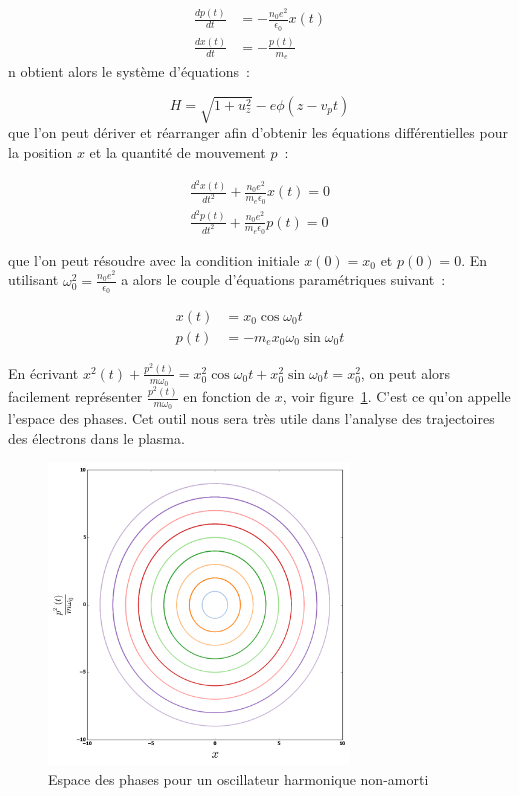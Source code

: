 \documentclass[a4paper]{book}
\begin{document}
\begin{eqnarray}
        \frac{dp(t)}{dt}&=-\frac{n_0e^2}{\epsilon_0}x(t)\\
        \frac{dx(t)}{dt}&=-\frac{p(t)}{m_e}
\end{eqnarray}
n obtient alors le système d'équations~:

\begin{equation}
    H=\sqrt{1+u_z^2}-e\phi(z-v_pt)
\end{equation}
que l'on peut dériver et réarranger afin d'obtenir les équations différentielles pour la position $x$ et la quantité de mouvement $p$~:

\begin{eqnarray}
        \frac{d^2x(t)}{dt^2} +\frac{n_0e^2}{m_e\epsilon_0}x(t)= 0\\
        \frac{d^2p(t)}{dt^2} +\frac{n_0e^2}{m_e\epsilon_0}p(t)= 0
\end{eqnarray}

que l'on peut résoudre avec la condition initiale $x(0)=x_0$ et $p(0)=0$. En utilisant $\omega_0^2=\frac{n_0e^2}{\epsilon_0}$ a alors le couple d'équations paramétriques suivant~:

\begin{eqnarray}
       x(t)&=x_0\cos{\omega_0 t} \\
       p(t)&=-m_ex_0\omega_0\sin{\omega_0 t}
\end{eqnarray}

En écrivant $x^2(t)+\frac{p^2(t)}{m\omega_0}=x_0^2\cos{\omega_0t}+x_0^2\sin{\omega_0t}=x_0^2$, on peut alors facilement représenter $\frac{p^2(t)}{m\omega_0}$ en fonction de $x$, voir figure~\ref{fig:espace_phases}. C'est ce qu'on appelle l'espace des phases. Cet outil nous sera très utile dans l'analyse des trajectoires des électrons dans le plasma. 


\begin{figure}[!htbp]
\begin{center}
\includegraphics[width=8cm]{pictures/simple_phase_space.png}
\end{center}
\caption{Espace des phases pour un oscillateur harmonique non-amorti}
\label{fig:espace_phases}
\end{figure}
\end{document}
